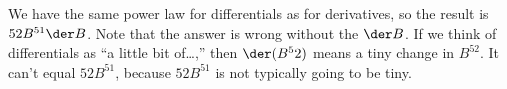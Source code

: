 We have the same power law for differentials as for derivatives, so the result is $52 B^{51}\der B$. Note that
the answer is wrong without the $\der B$. If we think of differentials as ``a little bit of\ldots,''
then $\der(B^52)$ means a tiny change in $B^{52}$. It can't equal $52 B^{51}$, because $52 B^{51}$ is not typically
going to be tiny.
